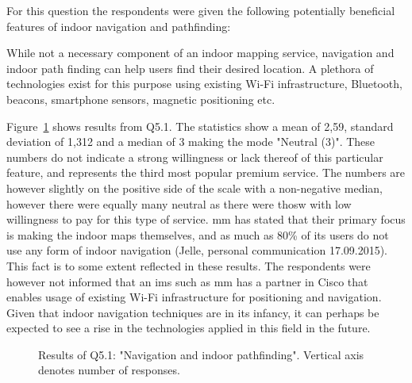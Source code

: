 For this question the respondents were given the following potentially beneficial features of indoor navigation and pathfinding:

\begin{displayquote}
While not a necessary component of an indoor mapping service, navigation and indoor path finding can help users find their desired location. A plethora of technologies exist for this purpose using existing Wi-Fi infrastructure, Bluetooth, beacons, smartphone sensors, magnetic positioning etc.
\end{displayquote}

Figure~\ref{fig:q51} shows results from Q5.1. The statistics show a mean of 2,59, standard deviation of 1,312 and a median of 3 making the mode "Neutral (3)". These numbers do not indicate a strong willingness or lack thereof of this particular feature, and represents the third most popular premium service. The numbers are however slightly on the positive side of the scale with a non-negative median, however there were equally many neutral as there were thosw with low willingness to pay for this type of service. \gls{mm} has stated that their primary focus is making the indoor maps themselves, and as much as 80\% of its users do not use any form of indoor navigation (Jelle, personal communication 17.09.2015). This fact is to some extent reflected in these results. The respondents were however not informed that an \gls{ims} such as \gls{mm} has a partner in Cisco that enables usage of existing Wi-Fi infrastructure for positioning and navigation. Given that indoor navigation techniques are in its infancy, it can perhaps be expected to see a rise in the technologies applied in this field in the future. 

\begin{figure}[H]
    \centering
    \caption{Results of Q5.1: "Navigation and indoor pathfinding". Vertical axis denotes number of responses.}
    \label{fig:q51}
\end{figure}

